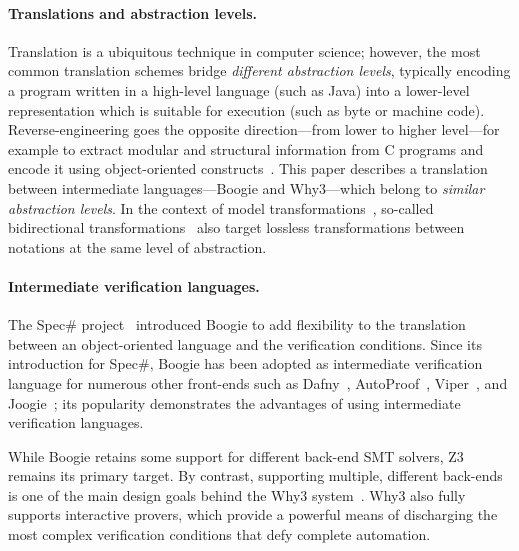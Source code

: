 \documentclass[a4paper,final]{llncs}
\makeatletter
\newif\iflong
\newcommand{\Boogie}{Boogie\xspace}
\newcommand{\Why}{Why3\xspace}
\newcommand{\tightParagraph}[1]{\paragraph{#1}}
\newcommand\tightParagraph{\@startsection{paragraph}{4}{\z@}{-5\p@ \@plus -4\p@ \@minus -4\p@}{-0.5em \@plus -0.22em \@minus -0.1em}{\normalfont\normalsize\itshape}}
\makeatother
\begin{document}
\tightParagraph{Translations and abstraction levels.}
Translation is a ubiquitous technique in computer science; however, the most common translation schemes bridge \emph{different abstraction levels}, typically encoding a program written in a high-level language (such as Java) into a lower-level representation which is suitable for execution (such as byte or machine code).
Reverse-engineering goes the opposite direction---from lower to higher level---for example to extract modular and structural information from C programs and encode it using object-oriented constructs~\cite{TFNM-ECOOP13}.
This paper describes a translation between intermediate languages---\Boogie and \Why---which belong to \emph{similar abstraction levels}.
In the context of model transformations~\cite{MensG06}, so-called bidirectional transformations~\cite{Stevens07} also target lossless transformations between notations at the same level of abstraction.


\tightParagraph{Intermediate verification languages.}
The Spec\# project~\cite{BarnettFLMSV11} introduced \Boogie to add flex\-i\-bil\-i\-ty to the translation between an object-oriented language \iflong(a dialect of C\#)\fi{} and the verification con\-di\-tions{}\iflong in the logic fragments supported by SMT solvers\fi.
\iflong
An intermediate verification language embodies the idea of intermediate representation---a technique widespread in compiler construction---in the context of verification.
\fi{} 
Since its introduction for Spec\#, \Boogie has been adopted as intermediate verification language for numerous other front-ends such as Dafny~\cite{Leino04}, AutoProof~\cite{TFNP-TACAS15}, Viper~\cite{HeuleKMS13}, and Joogie~\cite{ArltS12}; 
its popularity demonstrates the advantages of using intermediate verification languages.

While \Boogie retains some support for different back-end SMT solvers, Z3\iflong~\cite{Z3}\fi{} remains its\iflong{} fully supported \fi{} primary target.
By contrast, supporting multiple, different back-ends is one of the main design goals behind the \Why system~\cite{FilliatreP13}\iflong, which does not merely generate verification conditions in different formats but offers techniques to split them into independently verifiable units and to dispatch each unit to a different prover\fi.
\Why also fully supports interactive provers,\iflong\footnote{In comparison, \Boogie's support for HOL is restricted and not up-to-date~\cite{BohmeLW08}.}\fi{} which provide a powerful means of discharging the most complex verification conditions that defy complete automation.
\end{document}
